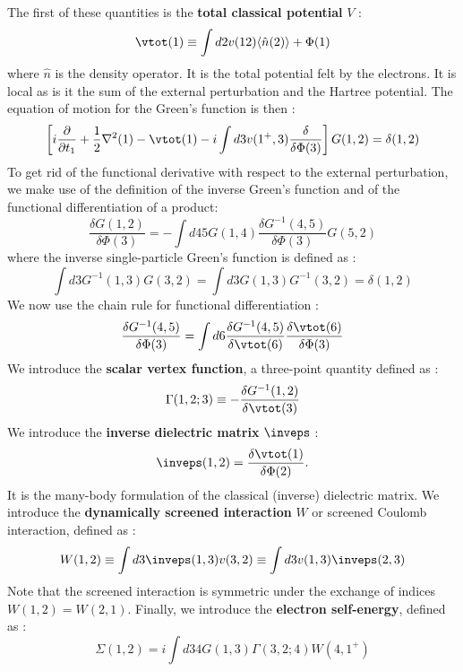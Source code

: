 The first of these quantities is the \textbf{total classical potential} $V$ : 
\begin{equation}
	\vtot (1) \equiv \int d2 v(12) \langle \hat{n}(2) \rangle + \Phi(1) \label{eq:vtot}
\end{equation}
where $\hat{n}$ is the density operator. It is the total potential felt by the electrons. It is local as is it the sum of the external perturbation and the Hartree potential. The equation of motion for the Green's function is then :
\begin{equation}
	\left[ i \frac{\partial}{\partial t_1} + \frac{1}{2}\nabla^2(1) - \vtot (1) -i\int d3 v(1^+,3) \frac{\delta}{\delta \Phi(3)} \right] G(1,2) = \delta(1,2) \label{eq:GF_EOM}
\end{equation}
To get rid of the functional derivative with respect to the external perturbation, we make use of the definition of the inverse Green's function and of the functional differentiation of a product:
\begin{equation}
	\frac{\delta G(1,2)}{\delta \Phi(3)} = - \int d45 G(1,4) \frac{\delta G^{-1}(4,5)}{\delta \Phi(3)} G(5,2)
\end{equation}
where the inverse single-particle Green's function is defined as :
\begin{equation}
	\int d3 G^{-1}(1,3) G(3,2) = \int d3 G(1,3)G^{-1}(3,2) = \delta(1,2) \label{eq:inv_GF}
\end{equation}
We now use the chain rule for functional differentiation :
\begin{equation}
	\frac{\delta G^{-1}(4,5)}{\delta \Phi(3)} = \int d6 \frac{\delta G^{-1}(4,5)}{\delta \vtot(6)} \frac{\delta \vtot(6)}{\delta \Phi(3)}
\end{equation}
We introduce the \textbf{scalar vertex function}, a three-point quantity defined as :
\begin{equation}
	\Gamma(1,2;3) \equiv -\frac{\delta G^{-1}(1,2)}{\delta \vtot(3)} \label{eq:vertex}
\end{equation}
We introduce the \textbf{inverse dielectric matrix} $\inveps$ :
\begin{equation}
	\inveps(1,2) = \frac{\delta \vtot(1)}{\delta \Phi(2)}.
\end{equation} 
It is the many-body formulation of the classical (inverse) dielectric matrix. 
We introduce the \textbf{dynamically screened interaction} $W$ or screened Coulomb interaction, defined as :
\begin{equation}
	W(1,2) \equiv \int d3 \inveps(1,3) v(3,2) \equiv \int d3 v(1,3) \inveps(2,3)
\end{equation}
Note that the screened interaction is symmetric under the exchange of indices $W(1,2) = W(2,1)$.
Finally, we introduce the \textbf{electron self-energy}, defined as :
\begin{equation}
	\Sigma(1,2) = i \int d34 G(1,3) \Gamma(3,2;4) W(4,1^+)
\end{equation}
%

